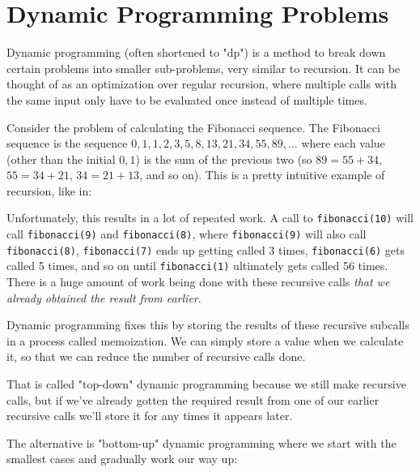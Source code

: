\section{Dynamic Programming Problems}
  

Dynamic programming (often shortened to "dp") is a method to break down certain problems into smaller sub-problems, very similar to recursion. It can be thought of as an optimization over regular recursion, where multiple calls with the same input only have to be evaluated once instead of multiple times.

Consider the problem of calculating the Fibonacci sequence. The Fibonacci sequence is the sequence $0,1,1,2,3,5,8,13,21,34,55,89,...$ where each value (other than the initial $0,1$) is the sum of the previous two (so $89 = 55 + 34$, $55 = 34 + 21$, $34 = 21 + 13$, and so on). This is a pretty intuitive example of recursion, like in:


Unfortunately, this results in a lot of repeated work. A call to \texttt{fibonacci(10)} will call \texttt{fibonacci(9)} and \texttt{fibonacci(8)}, where \texttt{fibonacci(9)} will also call \texttt{fibonacci(8)}, \texttt{fibonacci(7)} ends up getting called 3 times, \texttt{fibonacci(6)} gets called 5 times, and so on until \texttt{fibonacci(1)} ultimately gets called 56 times. There is a huge amount of work being done with these recursive calls \textit{that we already obtained the result from earlier}.

Dynamic programming fixes this by storing the results of these recursive subcalls in a process called memoization. We can simply store a value when we calculate it, so that we can reduce the number of recursive calls done.


That is called "top-down" dynamic programming because we still make recursive calls, but if we've already gotten the required result from one of our earlier recursive calls we'll store it for any times it appears later.

The alternative is "bottom-up" dynamic programming where we start with the smallest cases and gradually work our way up:


